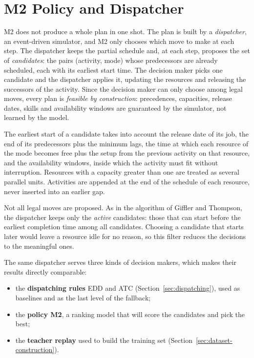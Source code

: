 \section{M2 Policy and Dispatcher}
\label{sec:m2}

M2 does not produce a whole plan in one shot. The plan is built by a \emph{dispatcher}, an
event-driven simulator, and M2 only chooses which move to make at each step. The dispatcher
keeps the partial schedule and, at each step, proposes the set of \emph{candidates}: the pairs
(activity, mode) whose predecessors are already scheduled, each with its earliest start time.
The decision maker picks one candidate and the dispatcher applies it, updating the resources and
releasing the successors of the activity. Since the decision maker can only choose among legal
moves, every plan is \emph{feasible by construction}: precedences, capacities, release dates,
skills and availability windows are guaranteed by the simulator, not learned by the model.

The earliest start of a candidate takes into account the release date of its job, the end of
its predecessors plus the minimum lags, the time at which each resource of the mode becomes free
plus the setup from the previous activity on that resource, and the availability windows, inside
which the activity must fit without interruption. Resources with a capacity greater than one are
treated as several parallel units. Activities are appended at the end of the schedule of each
resource, never inserted into an earlier gap.

Not all legal moves are proposed. As in the algorithm of Giffler and Thompson, the dispatcher
keeps only the \emph{active} candidates: those that can start before the earliest completion time
among all candidates. Choosing a candidate that starts later would leave a resource idle for no
reason, so this filter reduces the decisions to the meaningful ones.

The same dispatcher serves three kinds of decision makers, which makes their results directly
comparable:
\begin{itemize}
  \item the \textbf{dispatching rules} EDD and ATC (Section~\ref{sec:dispatching}), used as
        baselines and as the last level of the fallback;
  \item the \textbf{policy M2}, a ranking model that will score the candidates and pick the
        best;
  \item the \textbf{teacher replay} used to build the training set
        (Section~\ref{sec:dataset-construction}).
\end{itemize}

